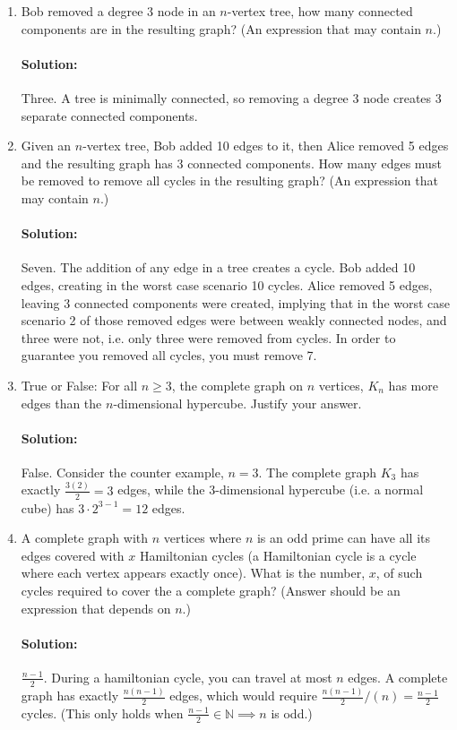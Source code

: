 \documentclass[11pt, notitlepage]{report}
\newcommand{\N}{\mathbb{N}}
\newenvironment{solution}{\paragraph{Solution:}}{\hfill}
\begin{document}
\begin{enumerate}[label=(\alph*)]
\item
Bob removed a degree $3$ node in an $n$-vertex tree, how many connected
components are in the resulting graph?  (An expression that may
contain $n$.)
\begin{solution}
Three. A tree is minimally connected, so removing a degree 3 node creates 3 separate connected components.

\end{solution}
\item
Given an $n$-vertex tree, Bob added 10 edges to it, then Alice removed 
5 edges and the resulting graph has 3 connected components.
How many edges must be removed to remove all cycles
in the resulting graph? (An expression that may contain $n$.)
\begin{solution}
Seven. The addition of any edge in a tree creates a cycle. Bob added 10 edges, creating in the worst case scenario 10 cycles. Alice removed 5 edges, leaving 3 connected components were created, implying that in the worst case scenario 2 of those removed edges were between weakly connected nodes, and three were not, i.e. only three were removed from cycles. In order to guarantee you removed all cycles, you must remove 7.

\end{solution}
\item
True or False: For all $n \geq 3$, the complete graph on $n$ vertices, $K_n$ has more
edges than the $n$-dimensional hypercube. Justify your answer.
\begin{solution}
	False. Consider the counter example, $n=3$. The complete graph $K_3$ has exactly $\frac{3(2)}{2}=3$ edges, while the 3-dimensional hypercube (i.e. a normal cube) has $3\cdot2^{3-1}=12$ edges.
	
\end{solution}
\item
A complete graph with $n$ vertices where $n$ is an odd prime can have all its edges
covered with $x$ Hamiltonian cycles (a Hamiltonian cycle is a cycle where
each vertex appears exactly once). What is the number, $x$,  of
such cycles required to cover the a complete graph? (Answer should be an expression that depends on $n$.)
\begin{solution}
	$\frac{n-1}{2}$. During a hamiltonian cycle, you can travel at most $n$ edges. A complete graph has exactly $\frac{n(n-1)}{2}$ edges, which would require $\frac{n(n-1)}{2} /(n) = \frac{n-1}{2}$ cycles. (This only holds when $\frac{n-1}{2} \in \N \implies n$ is odd.)
	

\end{solution}
\end{enumerate}
\end{document}
